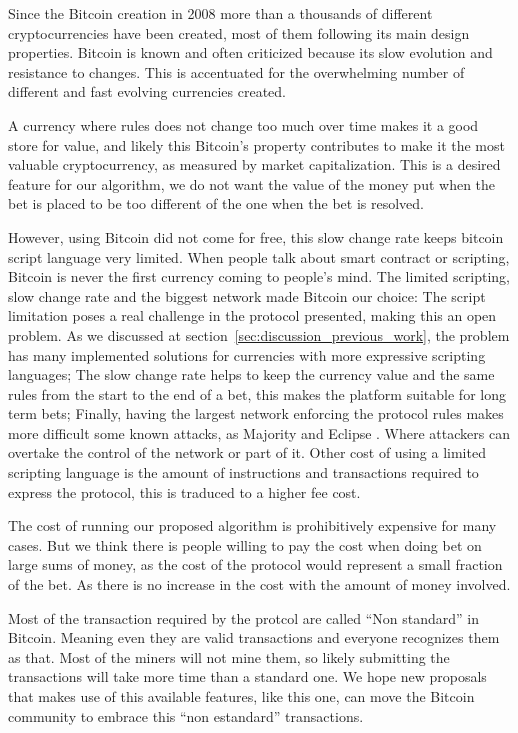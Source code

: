 Since the Bitcoin creation in 2008 more than a thousands of different
  cryptocurrencies have been created, most of them following its main design
  properties.
Bitcoin is known and often criticized because its slow evolution and resistance
  to changes.
This is accentuated for the overwhelming number of different and fast evolving
  currencies created.

A currency where rules does not change too much over time makes it a good store
  for value, and likely this Bitcoin's property contributes to make it the
  most valuable cryptocurrency, as measured by market capitalization.
This is a desired feature for our algorithm, we do not want the value of the
  money put when the bet is placed to be too different of the one when the bet
  is resolved.

However, using Bitcoin did not come for free, this slow change rate keeps
  bitcoin script language very limited.
When people talk about smart contract or scripting, Bitcoin is never the first
  currency coming to people's mind.
The limited scripting, slow change rate and the biggest network made Bitcoin our
  choice:
The script limitation poses a real challenge in the protocol presented, making this
  an open problem.
As we discussed at section~\ref{sec:discussion_previous_work}, the problem has
  many implemented solutions for currencies with more expressive scripting
  languages;
The slow change rate helps to keep the currency value and the same rules from
  the start to the end of a bet, this makes the platform suitable for long term
  bets;
Finally, having the largest network enforcing the protocol rules makes more
  difficult some known attacks, as Majority and Eclipse
  \cite{heilman2015eclipse}.
Where attackers can overtake the control of the network or part of it.
Other cost of using a limited scripting language is the amount of instructions
  and transactions required to express the protocol, this is traduced to a
  higher fee cost.

The cost of running our proposed algorithm is prohibitively expensive for many
  cases.
But we think there is people willing to pay the cost when doing bet on large
  sums of money, as the cost of the protocol would represent a small fraction of
  the bet.
As there is no increase in the cost with the amount of money involved.

Most of the transaction required by the protcol are called ``Non standard''
  in Bitcoin.
Meaning even they are valid transactions and everyone recognizes them as that.
Most of the miners will not mine them, so likely submitting the transactions
  will take more time than a standard one.
We hope new proposals that makes use of this available features, like this one,
  can move the Bitcoin community to embrace this ``non estandard'' transactions.

